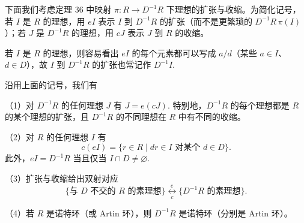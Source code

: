 下面我们考虑定理 36 中映射 \(\pi : R \to D^{-1}R\) 下理想的扩张与收缩。为简化记号，若 \(I\) 是 \(R\) 的理想，用 \(eI\) 表示 \(I\) 到 \(D^{-1}R\) 的扩张（而不是更繁琐的 \(D^{-1}R\,\pi(I)\)）；若 \(J\) 是 \(D^{-1}R\) 的理想，用 \(cJ\) 表示 \(J\) 到 \(R\) 的收缩。

若 \(I\) 是 \(R\) 的理想，则容易看出 \(eI\) 的每个元素都可以写成 \(a/d\)（某些 \(a \in I\)、\(d \in D\)），故 \(I\) 到 \(D^{-1}R\) 的扩张也常记作 \(D^{-1}I\).

\begin{proposition}\label{pro:15.38}
沿用上面的记号，我们有

（1）对 \(D^{-1}R\) 的任何理想 \(J\) 有 \(J = e(cJ)\). 特别地，\(D^{-1}R\) 的每个理想都是 \(R\) 的某个理想的扩张，且 \(D^{-1}R\) 的不同理想在 \(R\) 中有不同的收缩。

（2）对 \(R\) 的任何理想 \(I\) 有
\[
c(eI) = \{r \in R \mid dr \in I \text{ 对某个 } d \in D\}.
\]
此外，\(eI = D^{-1}R\) 当且仅当 \(I \cap D \neq \varnothing\).

（3）扩张与收缩给出双射对应
\[
\{\text{与 } D \text{ 不交的 } R \text{ 的素理想}\} \underset{c}{\overset{e}{\longleftrightarrow}} \{D^{-1}R \text{ 的素理想}\}.
\]

（4）若 \(R\) 是诺特环（或 Artin 环），则 \(D^{-1}R\) 是诺特环（分别是 Artin 环）。
\end{proposition}

